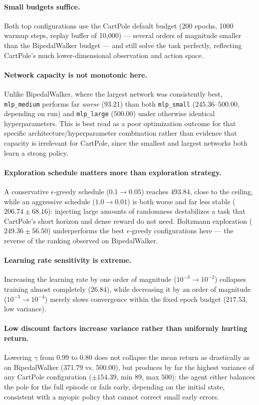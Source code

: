 \paragraph{Small budgets suffice.} Both top configurations use the CartPole default budget (200 epochs, 1000 warmup steps, replay buffer of 10,000) — several orders of magnitude smaller than the BipedalWalker budget — and still solve the task perfectly, reflecting CartPole's much lower-dimensional observation and action space.

\paragraph{Network capacity is not monotonic here.} Unlike BipedalWalker, where the largest network was consistently best, \texttt{mlp\_medium} performs far \emph{worse} ($93.21$) than both \texttt{mlp\_small} ($245.36$--$500.00$, depending on run) and \texttt{mlp\_large} ($500.00$) under otherwise identical hyperparameters. This is best read as a poor optimization outcome for that specific architecture/hyperparameter combination rather than evidence that capacity is irrelevant for CartPole, since the smallest and largest networks both learn a strong policy.

\paragraph{Exploration schedule matters more than exploration strategy.} A conservative $\epsilon$-greedy schedule ($0.1 \to 0.05$) reaches $493.84$, close to the ceiling, while an aggressive schedule ($1.0 \to 0.01$) is both worse and far less stable ($206.74 \pm 68.16$): injecting large amounts of randomness destabilizes a task that CartPole's short horizon and dense reward do not need. Boltzmann exploration ($249.36 \pm 56.50$) underperforms the best $\epsilon$-greedy configurations here — the reverse of the ranking observed on BipedalWalker.

\paragraph{Learning rate sensitivity is extreme.} Increasing the learning rate by one order of magnitude ($10^{-3} \to 10^{-2}$) collapses training almost completely ($26.84$), while decreasing it by an order of magnitude ($10^{-3} \to 10^{-4}$) merely slows convergence within the fixed epoch budget ($217.53$, low variance).

\paragraph{Low discount factors increase variance rather than uniformly hurting return.} Lowering $\gamma$ from $0.99$ to $0.80$ does not collapse the mean return as drastically as on BipedalWalker ($371.79$ vs. $500.00$), but produces by far the highest variance of any CartPole configuration ($\pm 154.39$, min $89$, max $500$): the agent either balances the pole for the full episode or fails early, depending on the initial state, consistent with a myopic policy that cannot correct small early errors.

